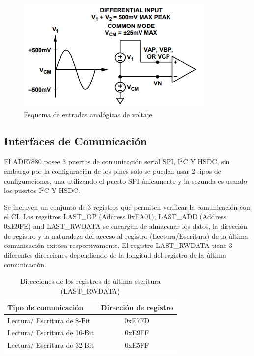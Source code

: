 \documentclass[letterpaper,12pt,oneside]{book}
\begin{document}
				\begin{figure}[!htpb]
					\centering
					\includegraphics[scale = 1.0]{Material de Consulta/EntAnVlt.PNG}
					\caption[Entradas analógicas de Voltaje]{Esquema de entradas analógicas de voltaje}
					\label{EntVolt}
				\end{figure}

			\subsection{Interfaces de Comunicación}
			El ADE7880 posee 3 puertos de comunicación serial SPI, I$^2$C Y HSDC, sin embargo por la configuración de los pines solo se pueden usar 2 tipos de configuraciones, una utilizando el puerto SPI únicamente y la segunda es usando los puertos I$^2$C Y HSDC.

			Se incluyen un conjunto de 3 registros que permiten verificar la comunicación con el CI. Los regsitros LAST\_OP (Address 0xEA01), LAST\_ADD (Address 0xE9FE) and LAST\_RWDATA se encargan de almacenar los datos, la dirección de registro y la naturaleza del acceso al registro (Lectura/Escritura) de la última comunicación exitosa respectivamente. El registro LAST\_RWDATA tiene 3 diferentes direcciones dependiendo de la longitud del registro de la última comunicación.

			\begin{table}[!htpb]
				\centering
				\begin{tabular}{ l | c }
					\textbf{Tipo de comunicación} & \textbf{Dirección de registro} \\
					\hline
					Lectura/ Escritura de 8-Bit & 0xE7FD \\
					Lectura/ Escritura de 16-Bit & 0xE9FF \\
					Lectura/ Escritura de 32-Bit & 0xE5FF \\
				\end{tabular}
				\caption[Registros de última escritura]{Direcciones de los registros de última escritura (LAST\_RWDATA)}
			\end{table}
\end{document}
